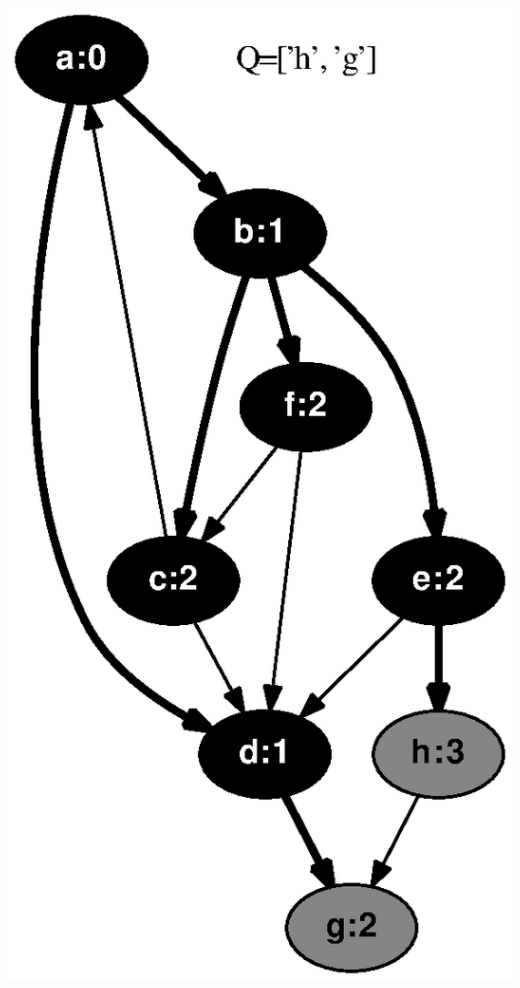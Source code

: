 \documentclass{article}
\begin{document}
\includegraphics[height=.3\textheight]{bfs_directed_classroom_06.eps}
\vspace{1em}
\end{document}
